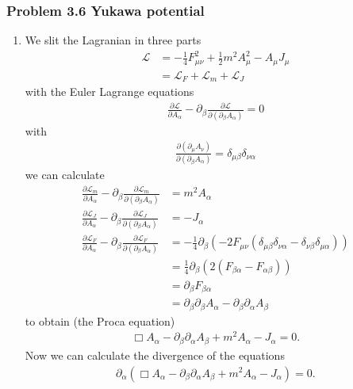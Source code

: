 \documentclass[10pt,a4paper]{article}
\theoremstyle{definition}
\begin{document}
\subsubsection{Problem 3.6 Yukawa potential}
\begin{enumerate}[label=(\alph*)]
\item We slit the Lagranian in three parts
\begin{align}
\mathscr{L}&=-\frac{1}{4}F_{\mu\nu}^2+\frac{1}{2}m^2A_\mu^2-A_\mu J_\mu\\
&=\mathscr{L}_F+\mathscr{L}_m+\mathscr{L}_J
\end{align}
with the Euler Lagrange equations
\begin{align}
        \frac{\partial\mathscr{L}}{\partial A_\alpha}-\partial_\beta\frac{\partial\mathscr{L}}{\partial(\partial_\beta A_\alpha)}=0
\end{align}
with
\begin{align}
    \frac{\partial(\partial_\mu A_\nu)}{\partial(\partial_\beta A_\alpha)}=\delta_{\mu\beta}\delta_{\nu\alpha}
\end{align}
we can calculate
\begin{align}
    \frac{\partial\mathscr{L}_m}{\partial A_\alpha}-\partial_\beta\frac{\partial\mathscr{L}_m}{\partial(\partial_\beta A_\alpha)}&=m^2A_\alpha\\
    \frac{\partial\mathscr{L}_J}{\partial A_\alpha}-\partial_\beta\frac{\partial\mathscr{L}_J}{\partial(\partial_\beta A_\alpha)}&=-J_\alpha\\
    \frac{\partial\mathscr{L}_F}{\partial A_\alpha}-\partial_\beta\frac{\partial\mathscr{L}_F}{\partial(\partial_\beta A_\alpha)}&=-\frac{1}{4}\partial_\beta\left(-2F_{\mu\nu}(\delta_{\mu\beta}\delta_{\nu\alpha}-\delta_{\nu\beta}\delta_{\mu\alpha})\right)\\
    &=\frac{1}{4}\partial_\beta\left(2(F_{\beta\alpha}-F_{\alpha\beta})\right)\\
    &=\partial_\beta F_{\beta\alpha}\\
    &=\partial_\beta\partial_\beta A_\alpha-\partial_\beta\partial_\alpha A_\beta
\end{align}
to obtain (the Proca equation)
\begin{align}
    \Box A_\alpha-\partial_\beta\partial_\alpha A_\beta+m^2A_\alpha-J_\alpha=0.
\end{align}
Now we can calculate the divergence of the equations
\begin{align}
    \partial_\alpha\left(\Box A_\alpha-\partial_\beta\partial_\alpha A_\beta+m^2A_\alpha-J_\alpha\right)=0.\\

\end{align}
\end{enumerate}
\end{document}
